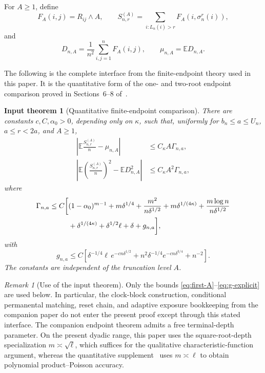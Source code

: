 \documentclass[11pt]{article}
\newtheorem{inputtheorem}[theorem]{Input theorem}
\theoremstyle{remark}
\newtheorem{remark}[theorem]{Remark}
\newcommand{\Ee}{\mathbb E}
\begin{document}
For $A\geq1$, define
\[
 F_A(i,j)=R_{ij}\wedge A,
 \qquad
 S_{n,r}^{(A)}=\sum_{i:L_n(i)>r}F_A(i,\sigma_n^r(i)),
\]
and
\[
 D_{n,A}=\frac1{n^2}\sum_{i,j=1}^nF_A(i,j),
 \qquad
 \mu_{n,A}=\Ee D_{n,A}.
\]

The following is the complete interface from the finite-endpoint theory
used in this paper.  It is the quantitative form of the one- and two-root
endpoint comparison proved in Sections~6--8 of~\cite{LongSwitch2026}.

\begin{inputtheorem}[Quantitative finite-endpoint comparison]
\label{input:endpoint}
There are constants $c,C,\alpha_0>0$, depending only on $\kappa$, such
that, uniformly for $b_n\leq a\leq U_n$, $a\leq r<2a$, and $A\geq1$,
\begin{align}
 \left|\Ee\frac{S_{n,r}^{(A)}}n-\mu_{n,A}\right|
 &\leq C_\kappa A\Gamma_{n,a},\label{eq:first-A}\\
 \left|\Ee\left(\frac{S_{n,r}^{(A)}}n\right)^2
       -\Ee D_{n,A}^2\right|
 &\leq C_\kappa A^2\Gamma_{n,a},\label{eq:second-A}
\end{align}
where
\begin{align}
 \Gamma_{n,a}\leq C\bigg[&
 (1-\alpha_0)^{m-1}
 +m\delta^{1/4}
 +\frac{m^2}{n\delta^{1/2}}
 +m\delta^{1/(4\kappa)}
 +\frac{m\log n}{n\delta^{1/2}}
 \notag\\
 &+\delta^{1/(4\kappa)}
 +\delta^{1/2}\ell
 +\delta
 +g_{n,a}\bigg],
 \label{eq:Gamma}
\end{align}
with
\begin{equation}\label{eq:g-explicit}
 g_{n,a}\leq C\left[
 \delta^{-1/4}\ell\,e^{-c n\delta^{1/2}}
 +n^2\delta^{-1/4}e^{-c n\delta^{3/4}}
 +n^{-2}
 \right].
\end{equation}
The constants are independent of the truncation level $A$.
\end{inputtheorem}

\begin{remark}[Use of the input theorem]
Only the bounds \eqref{eq:first-A}--\eqref{eq:g-explicit} are used below.
In particular, the clock-block construction, conditional permanental
matching, reset chain, and adaptive exposure bookkeeping from the companion
paper do not enter the present proof except through this stated interface.
The companion endpoint theorem admits a free terminal-depth parameter.  On
the present dyadic range, this paper uses the square-root-depth specialization
$m\asymp\sqrt\ell$, which suffices for the qualitative
characteristic-function argument, whereas the quantitative
supplement~\cite{LongBerry2026} uses $m\asymp\ell$ to obtain polynomial
product--Poisson accuracy.
\end{remark}
\end{document}
